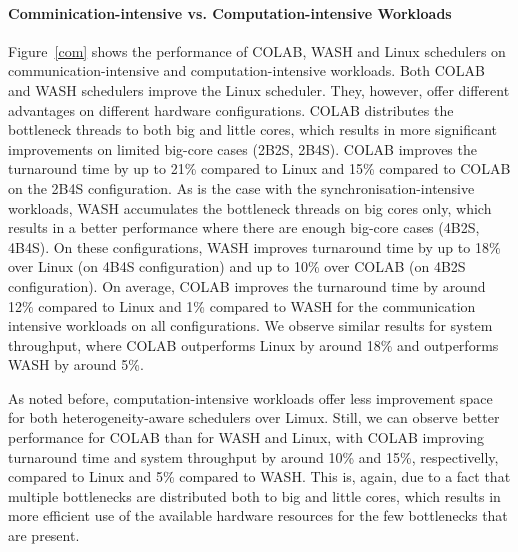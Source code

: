 \paragraph{Comminication-intensive vs. Computation-intensive Workloads} Figure~\ref{com} shows the performance of COLAB, WASH and Linux schedulers on communication-intensive and computation-intensive workloads. 
Both COLAB and WASH schedulers improve the Linux scheduler. They, however, offer different advantages on different hardware configurations. COLAB distributes the bottleneck threads to both big and little cores, which results in more significant improvements on limited big-core cases (2B2S, 2B4S). COLAB improves the turnaround time by up to 21\% compared to Linux and 15\% compared to COLAB on the 2B4S configuration. As is the case with the synchronisation-intensive workloads, WASH accumulates the bottleneck threads on big cores only, which results in a better performance where there are enough big-core cases (4B2S, 4B4S). On these configurations, WASH improves turnaround time by up to 18\% over Linux (on 4B4S configuration) and up to 10\% over COLAB (on 4B2S configuration). On average, COLAB improves the turnaround time by around 12\% compared to Linux and 1\% compared to WASH for the communication intensive workloads on all configurations. We observe similar results for system throughput, where COLAB outperforms Linux by around 18\% and outperforms WASH by around 5\%.

As noted before, computation-intensive workloads offer less improvement space for both heterogeneity-aware schedulers over Limux. Still, we can observe better performance for COLAB than for WASH and Linux, with COLAB improving turnaround time and system throughput by around 10\% and 15\%, respectivelly, compared to Linux and 5\% compared to WASH. This is, again, due to a fact that multiple bottlenecks are distributed both to big and little cores, which results in more efficient use of the available hardware resources for the few bottlenecks that are present.

